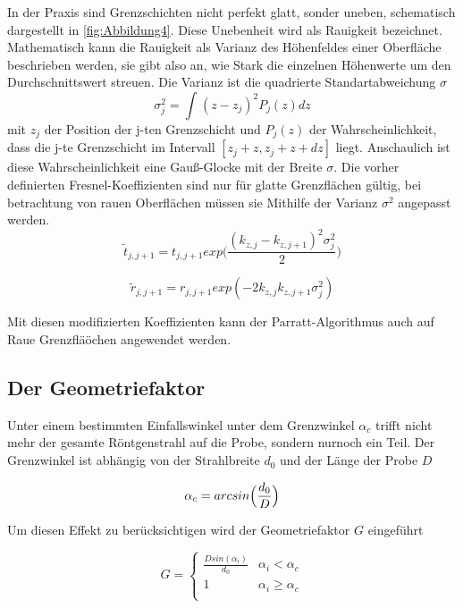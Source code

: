 In der Praxis sind Grenzschichten nicht perfekt glatt, sonder uneben, schematisch dargestellt in \autoref{fig:Abbildung4}. Diese Unebenheit wird als Rauigkeit bezeichnet.
Mathematisch kann die Rauigkeit als Varianz des Höhenfeldes einer Oberfläche beschrieben werden, sie gibt also an, wie Stark die einzelnen
Höhenwerte um den Durchschnittswert streuen. Die Varianz ist die quadrierte Standartabweichung $\sigma$ 
\begin{equation}
    \sigma^2_j=\int^{}(z-z_j)^2P_j(z)dz
\end{equation}
mit \(z_j\) der Position der j-ten Grenzschicht und \(P_j(z)\) der Wahrscheinlichkeit, dass die j-te
Grenzschicht im Intervall $[z_j+z,z_j+z+dz]$ liegt. Anschaulich ist diese Wahrscheinlichkeit eine Gauß-Glocke
mit der Breite $\sigma$. Die vorher definierten Fresnel-Koeffizienten sind nur für glatte Grenzflächen gültig, 
bei betrachtung von rauen Oberflächen müssen sie Mithilfe der Varianz $\sigma^2$ angepasst werden.
\begin{equation}
    \tilde{t}{_{j,j+1}}=t_{j,j+1}exp\Biggl(\frac{(k_{z,j}-k_{z,j+1})^{2}\sigma_j^2}{2}\Biggr)
\end{equation}

\begin{equation}
    \tilde{r}{_{j,j+1}}=r_{j,j+1}exp(-2k_{z,j}k_{z,j+1}\sigma_j^2)
\end{equation}

Mit diesen modifizierten Koeffizienten kann der Parratt-Algorithmus auch auf Raue Grenzfläöchen angewendet werden.
\subsection{Der Geometriefaktor}
Unter einem bestimmten Einfallswinkel unter dem Grenzwinkel $\alpha_c$ trifft nicht mehr der gesamte Röntgenstrahl
auf die Probe, sondern nurnoch ein Teil. Der Grenzwinkel ist abhängig von der Strahlbreite $d_0$ und der Länge der Probe \(D\)

\begin{equation}
    \alpha_c=arcsin\Bigl(\frac{d_0}{D}\Bigr)
\end{equation}

Um diesen Effekt zu berücksichtigen wird der Geometriefaktor \(G\) eingeführt

\begin{equation}
    G=
    \begin{cases}
        \frac{Dsin(\alpha_i)}{d_0}  &  \alpha_i < \alpha_c \\
        1                           & \alpha_i \ge \alpha_c \\

    \end{cases}
\end{equation}   


\cite{sample}
